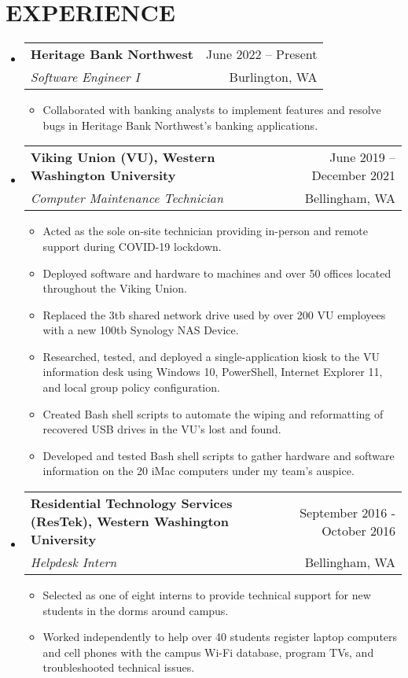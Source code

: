 \documentclass[letterpaper,11pt]{article}
\makeatletter
\newcommand{\resumeItem}[1]{
  \item\small{
    {#1 \vspace{-1pt}}
  }
}
\newcommand{\resumeSubheading}[4]{
  \vspace{-1pt}\item
    \begin{tabular*}{\textwidth}[t]{l@{\extracolsep{\fill}}r}
      \textbf{#1} & {\color{dark-grey}\small #2}\vspace{1pt}\\ %
      \textit{#3} & {\color{dark-grey} \small #4}\\ %
    \end{tabular*}\vspace{-4pt}
}
\newcommand{\resumeSubHeadingListStart}{\begin{itemize}[leftmargin=0in, label={}]}
\newcommand{\resumeSubHeadingListEnd}{\end{itemize}}
\newcommand{\resumeItemListStart}{\begin{itemize}}
\newcommand{\resumeItemListEnd}{\end{itemize}\vspace{0pt}}
\makeatother
\begin{document}
\section{EXPERIENCE}
  \resumeSubHeadingListStart

    \resumeSubheading
      {Heritage Bank Northwest}{June 2022 -- Present}
      {Software Engineer I}{Burlington, WA}

     \resumeItemListStart
        \resumeItem{Collaborated with banking analysts to implement features and resolve bugs in Heritage Bank Northwest's banking applications.}
     \resumeItemListEnd 

    \resumeSubheading
      {Viking Union (VU), Western Washington University}{June 2019 -- December 2021}
      {Computer Maintenance Technician}{Bellingham, WA}
      \resumeItemListStart
        \resumeItem{Acted as the sole on-site technician providing in-person and remote support during COVID-19 lockdown.}
        \resumeItem{Deployed software and hardware to machines and over 50 offices located throughout the Viking Union.}
        \resumeItem{Replaced the 3tb shared network drive used by over 200 VU employees with a new 100tb Synology NAS Device.}
        \resumeItem{Researched, tested, and deployed a single-application kiosk to the VU information desk using Windows 10, PowerShell, Internet Explorer 11, and local group policy configuration.}
        \resumeItem{Created Bash shell scripts to automate the wiping and reformatting of recovered USB drives in the VU’s lost and found.}
        \resumeItem{Developed and tested Bash shell scripts to gather hardware and software information on the 20 iMac computers under my team's auspice.}
      \resumeItemListEnd

    \resumeSubheading
      {Residential Technology Services (ResTek), Western Washington University}{September 2016 - October 2016}
      {Helpdesk Intern}{Bellingham, WA}
      \resumeItemListStart
        \resumeItem{Selected as one of eight interns to provide technical support for new students in the dorms around campus. }
        \resumeItem{Worked independently to help over 40 students register laptop computers and cell phones with the campus Wi-Fi database, program TVs, and troubleshooted technical issues.}
      \resumeItemListEnd
  \resumeSubHeadingListEnd


\end{document}
